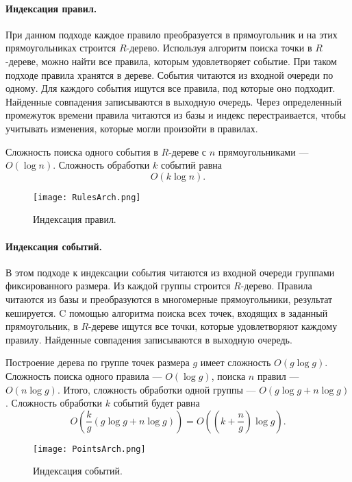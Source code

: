 \documentclass[14pt]{article}
\begin{document}
\paragraph{Индексация правил.} При данном подходе каждое правило преобразуется в прямоугольник и на этих прямоугольниках строится $R$-дерево. Используя алгоритм поиска точки в $R$-дереве, можно найти все правила, которым удовлетворяет событие. При таком подходе правила хранятся в дереве. События читаются из входной очереди по одному. Для каждого события ищутся все правила, под которые оно подходит. Найденные совпадения записываются в выходную очередь. Через определенный промежуток времени правила читаются из базы и индекс перестраивается, чтобы учитывать изменения, которые могли произойти в правилах.

Сложность поиска одного события в $R$-дереве с $n$ прямоугольниками --- $O(\log n)$. Сложность обработки $k$ событий равна
\[O(k \log n).\]

\begin{figure}[h]
  \centering
    \texttt{[image: RulesArch.png]}
  \caption{Индексация правил.}
\end{figure}

\paragraph{Индексация событий.} В этом подходе к индексации события читаются из входной очереди группами фиксированного размера. Из каждой группы строится $R$-дерево. Правила читаются из базы и преобразуются в многомерные прямоугольники, результат кешируется. C помощью алгоритма поиска всех точек, входящих в заданный прямоугольник, в $R$-дереве ищутся все точки, которые удовлетворяют каждому правилу. Найденные совпадения записываются в выходную очередь.

Построение дерева по группе точек размера $g$ имеет сложность $O(g\log g)$. Сложность поиска одного правила --- $O(\log g)$, поиска $n$ правил --- $O(n\log g)$. Итого, сложность обработки одной группы --- $O(g\log g + n\log g)$. Сложность обработки $k$ событий будет равна
\[ O\left(\frac{k}{g}(g\log g + n\log g)\right) = O\left(\left(k + \frac{n}{g}\right)\log g\right).\]

\begin{figure}[h]
  \centering
    \texttt{[image: PointsArch.png]}
  \caption{Индексация событий.}
\end{figure}
\end{document}
